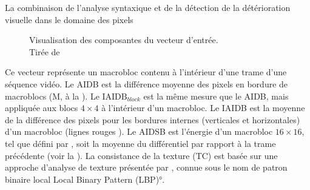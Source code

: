 \begin{section}{La combinaison de l'analyse syntaxique et de la
détection de la détérioration visuelle dans le domaine des pixels}
\begin{figure}
	\caption[Visualisation des composantes du vecteur d'entrée]
	{Visualisation des composantes du vecteur d'entrée. \\Tirée de \citet[p.~79-80]{Farrugia2010}}
	\label{fig-Debono}
\end{figure}

Ce vecteur représente un macrobloc contenu à l'intérieur d'une trame d'une
séquence vidéo. Le AIDB est la différence moyenne des pixels en bordure de
macroblocs (M, à la ). Le $\text{IAIDB}_{block}$ est la même
mesure que le AIDB, mais appliquée aux blocs $4 \times 4$ à l'intérieur d'un
macrobloc. Le IAIDB est la moyenne de la différence des pixels pour les bordures
internes (verticales et horizontales) d'un macrobloc (lignes rouges
). Le AIDSB est l'énergie d'un macrobloc $16 \times 16$,
tel que défini par \citet{Ikuno2007}, soit la moyenne du différentiel par
rapport à la trame précédente (voir la ). La consistance de
la texture (TC) est basée sur une approche d'analyse de texture présentée par
\citet{Wang1990}, connue sous le nom de patron binaire local \ang{Local Binary
Pattern (LBP)}.


\end{section}
